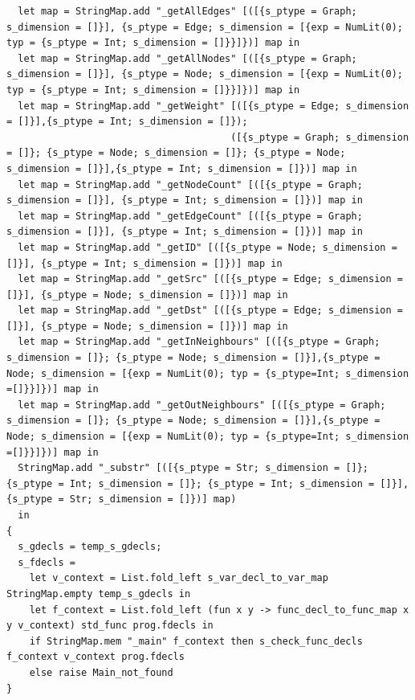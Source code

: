 \documentclass[a4paper,12pt]{article}
\begin{document}
\begin{lstlisting}
  let map = StringMap.add "_getAllEdges" [([{s_ptype = Graph; s_dimension = []}], {s_ptype = Edge; s_dimension = [{exp = NumLit(0); typ = {s_ptype = Int; s_dimension = []}}]})] map in
  let map = StringMap.add "_getAllNodes" [([{s_ptype = Graph; s_dimension = []}], {s_ptype = Node; s_dimension = [{exp = NumLit(0); typ = {s_ptype = Int; s_dimension = []}}]})] map in
  let map = StringMap.add "_getWeight" [([{s_ptype = Edge; s_dimension = []}],{s_ptype = Int; s_dimension = []});
                                       ([{s_ptype = Graph; s_dimension = []}; {s_ptype = Node; s_dimension = []}; {s_ptype = Node; s_dimension = []}],{s_ptype = Int; s_dimension = []})] map in
  let map = StringMap.add "_getNodeCount" [([{s_ptype = Graph; s_dimension = []}], {s_ptype = Int; s_dimension = []})] map in
  let map = StringMap.add "_getEdgeCount" [([{s_ptype = Graph; s_dimension = []}], {s_ptype = Int; s_dimension = []})] map in
  let map = StringMap.add "_getID" [([{s_ptype = Node; s_dimension = []}], {s_ptype = Int; s_dimension = []})] map in
  let map = StringMap.add "_getSrc" [([{s_ptype = Edge; s_dimension = []}], {s_ptype = Node; s_dimension = []})] map in
  let map = StringMap.add "_getDst" [([{s_ptype = Edge; s_dimension = []}], {s_ptype = Node; s_dimension = []})] map in
  let map = StringMap.add "_getInNeighbours" [([{s_ptype = Graph; s_dimension = []}; {s_ptype = Node; s_dimension = []}],{s_ptype = Node; s_dimension = [{exp = NumLit(0); typ = {s_ptype=Int; s_dimension =[]}}]})] map in
  let map = StringMap.add "_getOutNeighbours" [([{s_ptype = Graph; s_dimension = []}; {s_ptype = Node; s_dimension = []}],{s_ptype = Node; s_dimension = [{exp = NumLit(0); typ = {s_ptype=Int; s_dimension =[]}}]})] map in
  StringMap.add "_substr" [([{s_ptype = Str; s_dimension = []}; {s_ptype = Int; s_dimension = []}; {s_ptype = Int; s_dimension = []}], {s_ptype = Str; s_dimension = []})] map)
  in
{
  s_gdecls = temp_s_gdecls;
  s_fdecls =
    let v_context = List.fold_left s_var_decl_to_var_map StringMap.empty temp_s_gdecls in
    let f_context = List.fold_left (fun x y -> func_decl_to_func_map x y v_context) std_func prog.fdecls in
    if StringMap.mem "_main" f_context then s_check_func_decls f_context v_context prog.fdecls
    else raise Main_not_found
}
\end{lstlisting}
\end{document}
